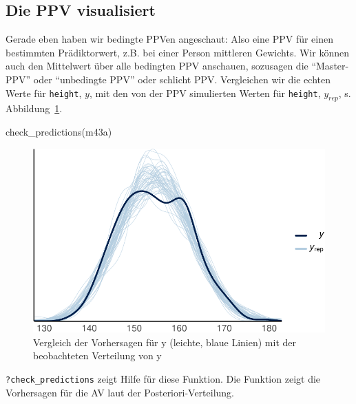 \documentclass[
  a4paper,
  DIV=11]{scrreprt}
\newenvironment{Shaded}{\begin{snugshade}}{\end{snugshade}}
\newcommand{\FunctionTok}[1]{\textcolor[rgb]{0.28,0.35,0.67}{#1}}
\newcommand{\NormalTok}[1]{\textcolor[rgb]{0.00,0.23,0.31}{#1}}
\theoremstyle{definition}
\theoremstyle{remark}
\begin{document}
\hypertarget{die-ppv-visualisiert}{%
\subsection{Die PPV visualisiert}\label{die-ppv-visualisiert}}

Gerade eben haben wir bedingte PPVen angeschaut: Also eine PPV für einen
bestimmten Prädiktorwert, z.B. bei einer Person mittleren Gewichts. Wir
können auch den Mittelwert über alle bedingten PPV anschauen, sozusagen
die ``Master-PPV'' oder ``unbedingte PPV'' oder schlicht PPV.
Vergleichen wir die echten Werte für \texttt{height}, \(y\), mit den von
der PPV simulierten Werten für \texttt{height}, \(y_{rep}\), s.
Abbildung~\ref{fig-ppv-check}.

\begin{Shaded}
\begin{Highlighting}[]
\FunctionTok{check\_predictions}\NormalTok{(m43a) }
\end{Highlighting}
\end{Shaded}

\begin{figure}[H]

{\centering \includegraphics{./lineare-modelle_files/figure-pdf/fig-ppv-check-1.pdf}

}

\caption{\label{fig-ppv-check}Vergleich der Vorhersagen für y (leichte,
blaue Linien) mit der beobachteten Verteilung von y}

\end{figure}

\texttt{?check\_predictions} zeigt Hilfe für diese Funktion. Die
Funktion zeigt die Vorhersagen für die AV laut der
Posteriori-Verteilung.
\end{document}
